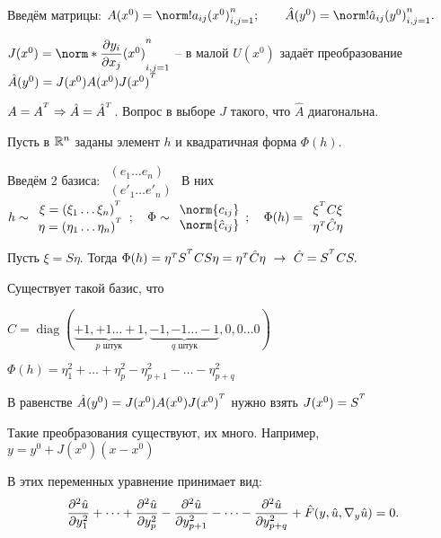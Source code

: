 \documentclass[../main.tex]{subfiles}
\begin{document}
Введём матрицы: 
$A(x^0)      = \norm!{ a_{ij}(x^0) }_{i,j=1}^n;   \qquad 
\hat{A}(y^0) = \norm!{ \hat{a}_{ij}(y^0) }_{i,j=1}^n.$

$J(x^0)      = \norm*{ \pd{y_i}{x_j}(x^0) }_{i,j=1}^n$
 -- в малой $U(x^0)$ задаёт преобразование $\hat{A}(y^0) = J(x^0) A(x^0) J(x^0)^{{}^T}$ 

$ A = A^{{}^T} 
\Rightarrow 
\hat{A} = \hat{A}^{{}^T}$. 
Вопрос в выборе $J$ такого, что $\hat{A}$ диагональна.

Пусть в $\mathbb{R}^n$ заданы элемент $h$ и квадратичная форма $\Phi(h).$

Введём 2 базиса: $
\begin{array}{c} 
  (e_1  \dots  e_n) \\
  (e'_1 \dots e'_n)
\end{array}$
%
В них $h \sim 
\begin{array}{c} 
  \xi  = (\xi_1  \dots \xi_n )^\Transp  \\
  \eta = (\eta_1 \dots \eta_n)^\Transp
\end{array}; \quad
% 
\Phi \sim 
\begin{array}{c} 
  \norm{c_{ij}}    \\
  \norm{\hat{c}_{ij}}
\end{array}; \quad
% 
\Phi(h) = 
\begin{array}{c}
  \xi ^\Transp    C    \xi   \\
  \eta^\transp \hat{C} \eta
\end{array}$

Пусть $\xi = S\eta$. 
Тогда $\Phi(h) = \eta^{\scriptscriptstyle T} S^{{}^T} C S \eta 
               = \eta^{\scriptscriptstyle T}    \hat{C}    \eta 
  \ \rightarrow\ \hat{C} = S^{{}^T} C S.$

Существует такой базис, что

$\hat{C} = \operatorname{diag}(
  \underbrace{+1, +1 \dots +1}_{p\text{ штук}}, 
  \underbrace{-1, -1 \dots -1}_{q\text{ штук}}, 
  0, 0 \dots 0)$

$\Phi(h) 
= \eta^2_1     + \dots + \eta^2_p 
- \eta^2_{p+1} - \dots - \eta^2_{p+q}$

В равенстве $\hat{A}(y^0) = J(x^0) A(x^0) J(x^0)^{{}^T}$ 
нужно взять $J(x^0) = S^{{}^T}$

Такие преобразования существуют, их много. 
Например, $y = y^0 + J(x^0)(x-x^0)$

В этих переменных уравнение принимает вид:
$$
  \dfrac{\partial^{2} \hat{u}}{\partial y_1^{2}}     + \dots + \dfrac{\partial^{2} \hat{u}}{\partial y_p^{2}}
- \dfrac{\partial^{2} \hat{u}}{\partial y_{p+1}^{2}} - \dots - \dfrac{\partial^{2} \hat{u}}{\partial y_{p+q}^{2}} 
+ \hat{F}(y,\hat{u},\nabla_y\hat{u}) 
= 0.$$
\end{document}

